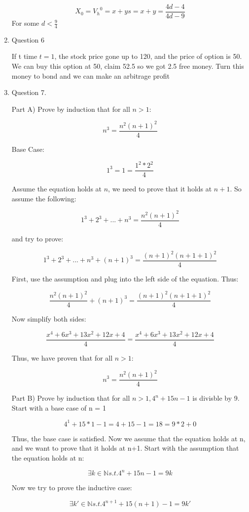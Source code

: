 \documentclass[]{book}
\theoremstyle{definition}
\begin{document}
\begin{enumerate}
$$X_0 = {V_h}^0 = x+ys = x+y = \frac{4d-4}{4d-9}$$
For some $d<\frac{9}{4}$









\item Question 6

If t time $t=1$, the stock price gone up to 120, and the price of option is 50. We can buy this option at 50, claim 52.5 so we got 2.5 free money. Turn this money to bond and we can make an arbitrage profit


\item Question 7.

Part A) Prove by induction that for all $n>1$:

$$n^3 = \frac{n^2(n+1)^2}{4}$$

Base Case:

$$1^3=1=\frac{1^2*2^2}{4}$$

Assume the equation holds at $n$, we need to prove that it holds at $n+1$. So assume the following:

$$1^3 + 2^3 + ... + n^3 = \frac{n^2(n+1)^2}{4}$$

and try to prove:

$$1^3 + 2^3 + ... + n^3 + (n+1)^3 = \frac{(n+1)^2(n+1+1)^2}{4}$$

First, use the assumption and plug into the left side of the equation. Thus:

$$\frac{n^2(n+1)^2}{4} + (n+1)^3 = \frac{(n+1)^2(n+1+1)^2}{4}$$

Now simplify both sides:

$$\frac{x^4+6x^3+13x^2+12x+4}{4}=\frac{x^4+6x^3+13x^2+12x+4}{4}$$

Thus, we have proven that for all $n>1$:

$$n^3 = \frac{n^2(n+1)^2}{4}$$


Part B) Prove by induction that for all $n>1, 4^n + 15n -1$ is divisble by 9. Start with a base case of n = 1

$$4^1 + 15 * 1 - 1 = 4 + 15 -1 = 18 = 9 * 2 + 0$$

Thus, the base case is satisfied. Now we assume that the equation holds at n, and we want to prove that it holds at n+1. Start with the assumption that the equation holds at n:

$$\exists k\in \mathbb{N} s.t.  4^n + 15n - 1 = 9k $$

Now we try to prove the inductive case:

$$\exists k'\in \mathbb{N} s.t.  4^{n+1} + 15(n+1) - 1 = 9k' $$


\end{enumerate}
\end{document}
